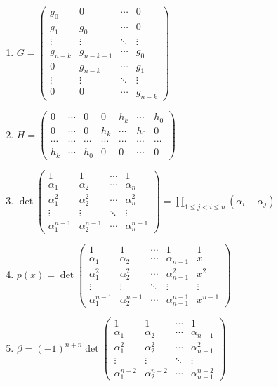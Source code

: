 \documentclass[oneside,10pt,]{article}
\newcommand{\lt}{<}
\begin{document}
\begin{enumerate}
\item{}\(G = \begin{pmatrix} g_0 & 0 & \cdots & 0 \\ g_1 & g_0 & \cdots & 0 \\ \vdots & \vdots &\ddots & \vdots \\ g_{n-k} & g_{n-k-1} & \cdots & g_0 \\ 0 & g_{n-k} & \cdots & g_{1} \\ \vdots & \vdots & \ddots & \vdots \\ 0 & 0 & \cdots & g_{n-k} \end{pmatrix}\)%
\item{}\(H = \begin{pmatrix} 0 & \cdots & 0 & 0 & h_k & \cdots & h_0 \\ 0 & \cdots & 0 & h_k & \cdots & h_0 & 0 \\ \cdots & \cdots & \cdots & \cdots & \cdots & \cdots & \cdots \\ h_k & \cdots & h_0 & 0 & 0 & \cdots & 0 \end{pmatrix}\)%
\item{}\(\det \begin{pmatrix} 1 & 1 & \cdots & 1 \\ \alpha_1 & \alpha_2 & \cdots & \alpha_n \\ \alpha_1^2 & \alpha_2^2 & \cdots & \alpha_n^2 \\ \vdots & \vdots & \ddots & \vdots \\ \alpha_1^{n-1} & \alpha_2^{n-1} & \cdots & \alpha_n^{n-1} \end{pmatrix} = \prod_{1 \leq j \lt i \leq n} (\alpha_i - \alpha_j)\)%
\item{}\(p(x) = \det \begin{pmatrix} 1 & 1 & \cdots & 1 & 1 \\ \alpha_1 & \alpha_2 & \cdots & \alpha_{n-1} & x \\ \alpha_1^2 & \alpha_2^2 & \cdots & \alpha_{n-1}^2 & x^2 \\ \vdots & \vdots & \ddots & \vdots & \vdots \\ \alpha_1^{n-1} & \alpha_2^{n-1} & \cdots & \alpha_{n-1}^{n-1} & x^{n-1} \end{pmatrix}\)%
\item{}\(\beta = (-1)^{n + n} \det \begin{pmatrix} 1 & 1 & \cdots & 1 \\ \alpha_1 & \alpha_2 & \cdots & \alpha_{n-1} \\ \alpha_1^2 & \alpha_2^2 & \cdots & \alpha_{n-1}^2 \\ \vdots & \vdots & \ddots & \vdots \\ \alpha_1^{n-2} & \alpha_2^{n-2} & \cdots & \alpha_{n-1}^{n-2} \end{pmatrix}\)%

\end{enumerate}
\end{document}
